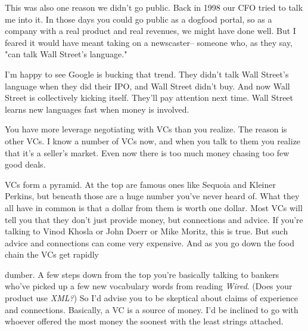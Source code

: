 This was also
                    one reason we didn't go public. Back in 1998 our CFO tried
                    to talk me into it. In those days you could go public as a
                    dogfood portal, so as a company with a real product and real
                    revenues, we might have done well. But I feared it would
                    have meant taking on a newscaster-- someone who, as they
                    say, "can talk Wall Street's language."

I'm happy
                    to see Google is bucking that trend. They didn't talk Wall
                    Street's language when they did their IPO, and Wall Street
                    didn't buy. And now Wall Street is collectively kicking
                    itself. They'll pay attention next time. Wall Street learns
                    new languages fast when money is involved.

You
                    have more leverage negotiating with VCs than you realize.
                    The reason is other VCs. I know a number of VCs now, and
                    when you talk to them you realize that it's a seller's
                    market. Even now there is too much money chasing too few
                    good deals.

VCs form a pyramid. At the top are
                    famous ones like Sequoia and Kleiner Perkins, but beneath
                    those are a huge number you've never heard of. What they all
                    have in common is that a dollar from them is worth one
                    dollar. Most VCs will tell you that they don't just provide
                    money, but connections and advice. If you're talking to
                    Vinod Khosla or John Doerr or Mike Moritz, this is true. But
                    such advice and connections can come very expensive. And as
                    you go down the food chain the VCs get rapidly
                    
                    dumber. A few steps down from the top you're basically
                    talking to bankers who've picked up a few new vocabulary
                    words from reading \emph{Wired}. (Does your product use
                    \emph{XML?}) So I'd advise you to be skeptical about claims
                    of experience and connections. Basically, a VC is a source
                    of money. I'd be inclined to go with whoever offered the
                    most money the soonest with the least strings attached.

